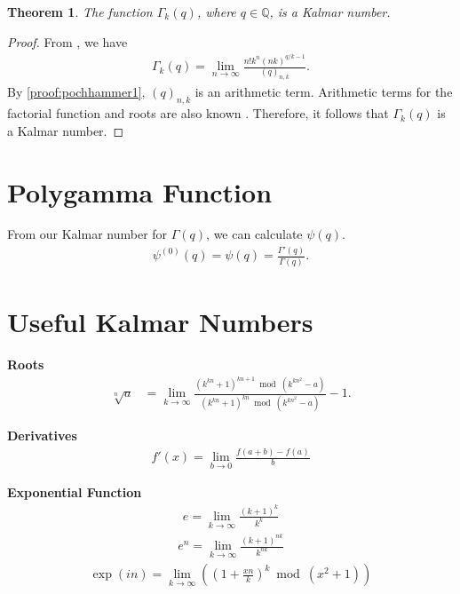\documentclass[10pt,a4paper]{article}
\theoremstyle{plain}
\newtheorem{theorem}{Theorem}[section]
\begin{document}
\begin{theorem}
The function $\Gamma_k(q)$, where $q \in \mathbb{Q}$, is a Kalmar number.
\end{theorem}
\begin{proof}
From \cite{diaz2005hypergeometric}, we have
\begin{align*}
\Gamma_k(q) = \lim_{n\to\infty} \frac{n! k^n (nk)^{q/k-1}}{(q)_{n,k}} .
\end{align*}
By \cref{proof:pochhammer1}, $(q)_{n,k}$ is an arithmetic term. Arithmetic terms for the factorial function and roots are also known \cite{prunescu2024factorial,shunia2024polynomial}. Therefore, it follows that $\Gamma_k(q)$ is a Kalmar number.
\end{proof}

\section{Polygamma Function}
From our Kalmar number for $\Gamma(q)$, we can calculate $\psi(q)$.
\begin{align*}
\psi^{(0)}(q) =\psi(q) = \frac{\Gamma'(q)}{\Gamma(q)} .
\end{align*}

\section{Useful Kalmar Numbers}

\textbf{Roots}
\begin{align}
\sqrt[n]{a} &= \lim_{k\to\infty}
    \frac{(k^{kn} + 1)^{kn+1} \bmod (k^{kn^2}-a)}
    {(k^{kn} + 1)^{kn} \bmod (k^{kn^2}-a)} - 1 .
\end{align}

\textbf{Derivatives}
\begin{align}
f'(x) = \lim_{b \to 0} \frac{f(a+b) - f(a)}{b}
\end{align}

\textbf{Exponential Function}
\begin{align*}
    e = \lim_{k\rightarrow\infty} \frac{(k+1)^k}{k^k}
\end{align*}
\begin{align*}
    e^n = \lim_{k\rightarrow\infty} \frac{(k+1)^{nk}}{k^{nk}}
\end{align*}
\begin{align*}
\exp(in) = \lim_{k\to\infty} \left(\left(1+\frac{xn}{k} \right)^k \bmod (x^2+1) \right)
\end{align*}
\end{document}
